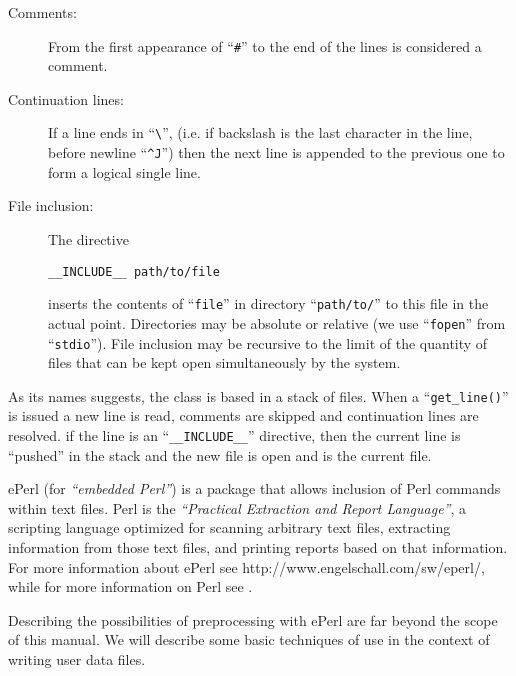 \begin{description}

\item[Comments:] From the first appearance of ``\verb+#+'' to the end
of the lines is considered a comment. 

\item[Continuation lines:] If a line ends in ``\verb+\+'',
(i.e. if backslash is the last character in the line, before newline
``\verb+^J+'') then the next line is appended to the previous one to
form a logical single line. 

\item [File inclusion: ] The directive 
%
\begin{verbatim}
__INCLUDE__ path/to/file
\end{verbatim}
%
inserts the contents of ``\verb+file+'' in directory
``\verb+path/to/+'' to this file in the actual point. Directories may
be absolute or relative (we use ``\verb+fopen+'' from
``\verb+stdio+''). File inclusion may be recursive to the limit of the
quantity of files that can be kept open simultaneously by the system.
\end{description}


As its names suggests, the class is based in a stack of files. When a 
``\verb+get_line()+'' is issued a new line is read, comments are
skipped and continuation lines are resolved. if the line is an
``\verb+__INCLUDE__+'' directive, then the current line is ``pushed''
in the stack and the new file is open and is the current file. 

\label{sec:eperl}  

%
ePerl (for \emph{``embedded Perl''}) is a package that allows
inclusion of Perl commands within text files. Perl is the
\emph{``Practical Extraction and Report Language''}, a scripting
language optimized for scanning arbitrary text files, extracting
information from those text files, and printing reports based on that
information. For more information about ePerl see
{http://www.engelschall.com/sw/eperl/}, while for more information on
Perl see .

Describing the possibilities of preprocessing with ePerl are far
beyond the scope of this manual. We will describe some basic
techniques of use in the context of writing \pfem{} user data files. 

